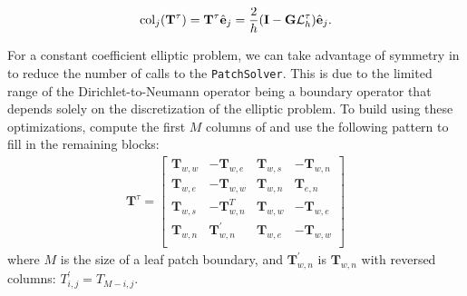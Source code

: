 \begin{align}
\text{col}_j (\mathbf T^{\tau}) = \mathbf T^{\tau} \hat{\textbf{e}}_j = \frac{2}{h} (\textbf{I} - \textbf{G} \mathcal{L}_h^{\tau}) \hat{\textbf{e}}_j.
\end{align}

For a constant coefficient elliptic problem, we can take advantage of symmetry in \Ttau to reduce the number of calls to the \texttt{PatchSolver}. This is due to the limited range of the Dirichlet-to-Neumann operator being a boundary operator that depends solely on the discretization of the elliptic problem. To build \Ttau using these optimizations, compute the first $M$ columns of \Ttau and use the following pattern to fill in the remaining blocks:
\begin{align}
\textbf{T}^{\tau} =
\begin{bmatrix}
    \textbf{T}_{w,w} & -\textbf{T}_{w,e} & \textbf{T}_{w,s} & -\textbf{T}_{w,n} \\
    \textbf{T}_{w,e} & -\textbf{T}_{w,w} & \textbf{T}_{w,n} & \textbf{T}_{e,n} \\
    \textbf{T}_{w,s} & -\textbf{T}_{w,n}^T & \textbf{T}_{w,w} & -\textbf{T}_{w,e} \\
    \textbf{T}_{w,n} & \textbf{T}_{w,n}^{'} & \textbf{T}_{w,e} & -\textbf{T}_{w,w} \\
\end{bmatrix}
\end{align}
where $M$ is the size of a leaf patch boundary, and $\textbf{T}_{w,n}^{'}$ is $\textbf{T}_{w,n}$ with reversed columns: $T_{i,j}^{'} = T_{M-i,j}$.


